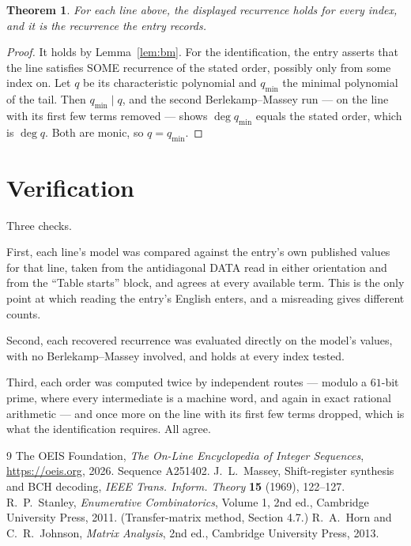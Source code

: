 \documentclass[11pt,a4paper]{article}
\theoremstyle{plain}
\newtheorem{theorem}{Theorem}
\theoremstyle{definition}
\begin{document}
\begin{theorem}
For each line above, the displayed recurrence holds for every index, and it is the recurrence
the entry records.
\end{theorem}

\begin{proof}
It holds by Lemma~\ref{lem:bm}. For the identification, the entry asserts that the line
satisfies SOME recurrence of the stated order, possibly only from some index on. Let $q$ be its
characteristic polynomial and $q_{\min}$ the minimal polynomial of the tail. Then
$q_{\min}\mid q$, and the second Berlekamp--Massey run --- on the line with its first few
terms removed --- shows $\deg q_{\min}$ equals the stated order, which is $\deg q$. Both are
monic, so $q=q_{\min}$.
\end{proof}

\section{Verification}

Three checks.

First, each line's model was compared against the entry's own published values for that line,
taken from the antidiagonal DATA read in either orientation and from the ``Table starts''
block, and agrees at every available term. This is the only point at which reading the entry's
English enters, and a misreading gives different counts.

Second, each recovered recurrence was evaluated directly on the model's values, with no
Berlekamp--Massey involved, and holds at every index tested.

Third, each order was computed twice by independent routes --- modulo a $61$-bit prime, where
every intermediate is a machine word, and again in exact rational arithmetic --- and once more
on the line with its first few terms dropped, which is what the identification requires. All
agree.

\begin{thebibliography}{9}
 The OEIS Foundation, \emph{The On-Line Encyclopedia of Integer
Sequences}, \url{https://oeis.org}, 2026. Sequence A251402.
 J.~L.~Massey, Shift-register synthesis and BCH decoding, \emph{IEEE
Trans. Inform. Theory} \textbf{15} (1969), 122--127.
 R.~P.~Stanley, \emph{Enumerative Combinatorics}, Volume 1, 2nd ed.,
Cambridge University Press, 2011. (Transfer-matrix method, Section 4.7.)
 R.~A.~Horn and C.~R.~Johnson, \emph{Matrix Analysis}, 2nd ed., Cambridge
University Press, 2013.
\end{thebibliography}
\end{document}
